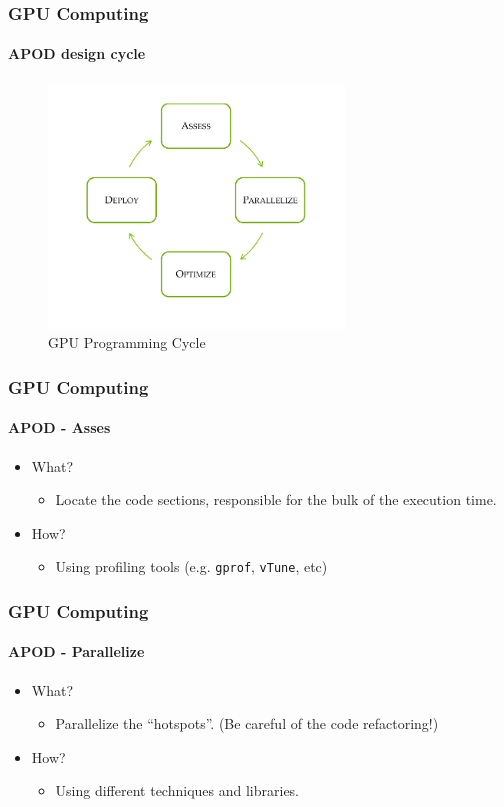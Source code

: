 \begin{frame}
    \frametitle{GPU Computing}
    \framesubtitle{APOD design cycle}
    \begin{figure}
        \centering
        \label{fig:apod}
        \includegraphics[width=0.7\textwidth]{img/apod}
        \caption{GPU Programming Cycle}
    \end{figure}
\end{frame}

\begin{frame}
    \frametitle{GPU Computing}
    \framesubtitle{APOD - Asses}
    \begin{itemize}
        \item What?
        \begin{itemize}
            \item Locate the code sections, responsible for the bulk of the execution time.
        \end{itemize}
        \item How?
        \begin{itemize}
            \item Using profiling tools (e.g. \texttt{gprof}, \texttt{vTune}, etc)
        \end{itemize}
    \end{itemize}
\end{frame}

\begin{frame}
    \frametitle{GPU Computing}
    \framesubtitle{APOD - Parallelize}
    \begin{itemize}
        \item What?
        \begin{itemize}
            \item Parallelize the ``hotspots''.
                (Be careful of the code refactoring!)
        \end{itemize}
        \item How?
        \begin{itemize}
            \item Using different techniques and libraries.
        \end{itemize}
    \end{itemize}
\end{frame}

